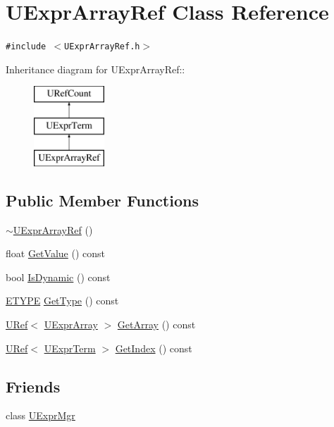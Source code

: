 \hypertarget{class_u_expr_array_ref}{
\section{UExprArrayRef Class Reference}
\label{class_u_expr_array_ref}
}
{\tt \#include $<$UExprArrayRef.h$>$}

Inheritance diagram for UExprArrayRef::\begin{figure}[H]
\begin{center}
\leavevmode
\includegraphics[height=3cm]{class_u_expr_array_ref}
\end{center}
\end{figure}
\subsection*{Public Member Functions}
\begin{CompactItemize}
\item 
\hyperlink{class_u_expr_array_ref_b550b66b0f55a17607edbea276e8ad65}{$\sim$UExprArrayRef} ()
\item 
float \hyperlink{class_u_expr_array_ref_de2f52b193a937e90bf8ceb1dd99ca40}{GetValue} () const 
\item 
bool \hyperlink{class_u_expr_array_ref_f5b291cf643bde2446086dabf8227ce8}{IsDynamic} () const 
\item 
\hyperlink{class_u_expr_term_20f132fb3c5e0228623e4268ba0d06c2}{ETYPE} \hyperlink{class_u_expr_array_ref_89284f8ec703cb0dd7314a731c593f3d}{GetType} () const 
\item 
\hyperlink{class_u_ref}{URef}$<$ \hyperlink{class_u_expr_array}{UExprArray} $>$ \hyperlink{class_u_expr_array_ref_8dbefb61e16ddb9f48e2168260a6b502}{GetArray} () const 
\item 
\hyperlink{class_u_ref}{URef}$<$ \hyperlink{class_u_expr_term}{UExprTerm} $>$ \hyperlink{class_u_expr_array_ref_0e539f170c37f1c49c8c35bb01bbdb22}{GetIndex} () const 
\end{CompactItemize}
\subsection*{Friends}
\begin{CompactItemize}
\item 
class \hyperlink{class_u_expr_array_ref_aba1a84b84f2ff7cab4b76539215bd34}{UExprMgr}
\end{CompactItemize}


